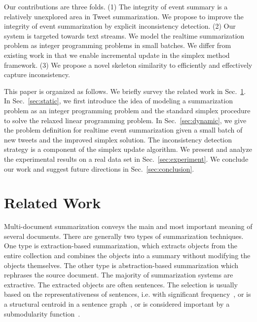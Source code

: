 \documentclass[envcountsame]{llncs}
\begin{document}
Our contributions are three folds. (1) The integrity of event summary is a relatively unexplored area in Tweet summarization. We propose to improve the integrity of event summarization by explicit inconsistency detection. (2) Our system is targeted towards text streams. We model the realtime summarization problem as integer programming problems in small batches. We differ from existing work in that we enable incremental update in the simplex method framework. (3) We propose a novel skeleton similarity to efficiently and effectively capture inconsistency.

This paper is organized as follows. We briefly survey the related work in Sec.~\ref{sec:related}. In Sec.~\ref{sec:static}, we first introduce the idea of modeling a summarization problem as an integer programming problem and the standard simplex procedure to solve the relaxed linear programming problem. In Sec.~\ref{sec:dynamic}, we give the problem definition for realtime event summarization given a small batch of new tweets and the improved simplex solution. The inconsistency detection strategy is a component of the simplex update algorithm. We present and analyze the experimental results on a real data set in Sec.~\ref{sec:experiment}. We conclude our work and suggest future directions in Sec.~\ref{sec:conclusion}.

\section{Related Work}\label{sec:related}

Multi-document summarization conveys the main and most important meaning of several documents. There are generally two types of summarization techniques. One type is extraction-based summarization, which extracts objects from the entire collection and combines the objects into a summary without modifying the objects themselves. The other type is abstraction-based summarization which rephrases the source document. The majority of summarization systems are extractive. The extracted objects are often sentences. The selection is usually based on the representativeness of sentences, i.e. with significant frequency~\cite{Yih2007Multi-document}, or is a structural centroid in a sentence graph~\cite{Lin2012Generating}, or is considered important by a submodularity function~\cite{MSSF}.
\end{document}
